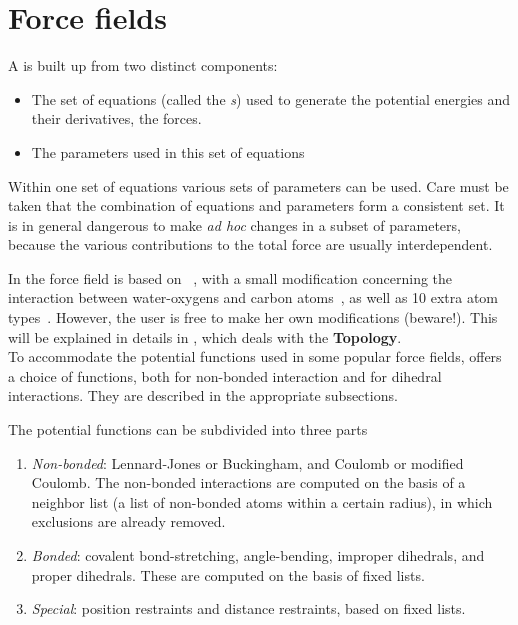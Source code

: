 \chapter{Force fields}
\label{ch:ff}
A  is built up from two distinct components:
\begin{itemize}
\item The set of equations (called the {\em {}s}) used to generate the potential energies and their
derivatives, the forces.
\item The parameters used in this set of equations
\end{itemize}
Within one set of equations various sets of parameters can be
used. Care must be taken that the combination of equations and
parameters form a consistent set. It is in general dangerous to make
{\em ad hoc} changes in a subset of parameters, because the various
contributions to the total force are usually interdependent.

In {\gromacs} {\gmxver} the force field is based on
~\cite{biomos},
with a small modification concerning the interaction between
water-oxygens and carbon atoms~\cite{Buuren93b,Mark94}, as well as 10
extra atom types~\cite{Jorgensen83,Buuren93a,Buuren93b,Mark94,Liu95}.
However, the user is free to make her own modifications (beware!).
This will be explained in details in , which deals
with the {\bf Topology}.\\ To accommodate the potential functions used
in some popular force fields, {\gromacs} offers a choice of functions,
both for non-bonded interaction and for dihedral interactions. They
are described in the appropriate subsections.

The potential functions can be subdivided into three parts
\begin{enumerate}
\item   {\em Non-bonded}: Lennard-Jones or Buckingham, and Coulomb or
modified Coulomb. The non-bonded interactions are computed on the
basis of a neighbor list (a list of non-bonded atoms within a certain
radius), in which exclusions are already removed.
\item   {\em Bonded}: covalent bond-stretching, angle-bending,
improper dihedrals, and proper dihedrals. These are computed on the
basis of fixed lists. 
\item   {\em Special}: position restraints and distance restraints,
based on fixed lists. 
\end{enumerate}

